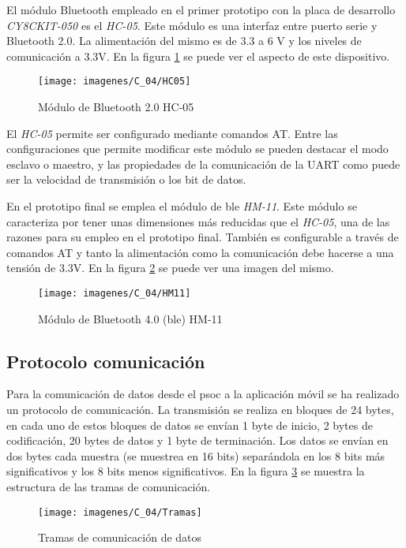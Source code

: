 El módulo Bluetooth empleado en el primer prototipo con la placa de desarrollo \textit{CY8CKIT-050} es el \textit{HC-05}. Este módulo es una interfaz entre puerto serie y Bluetooth 2.0. La alimentación del mismo es de 3.3 a 6 V y los niveles de comunicación a 3.3V. En la figura \ref{fig:HC05} se puede ver el aspecto de este dispositivo.

\begin{figure}[!ht]
	\center
	\texttt{[image: imagenes/C\_04/HC05]}
	\caption{Módulo de Bluetooth 2.0 HC-05}
	\label{fig:HC05}
\end{figure}

El \textit{HC-05} permite ser configurado mediante comandos AT. Entre las configuraciones que permite modificar este módulo se pueden destacar el modo esclavo o maestro, y las propiedades de la comunicación de la UART como puede ser la velocidad de transmisión o los bit de datos.
 
En el prototipo final se emplea el módulo de \acrshort{ble} \textit{HM-11}. Este módulo se caracteriza por tener unas dimensiones más reducidas que el \textit{HC-05}, una de las razones para su empleo en el prototipo final. También es configurable a través de comandos AT y tanto la alimentación como la comunicación debe hacerse a una tensión de 3.3V. En la figura \ref{fig:HC11} se puede ver una imagen del mismo.

\begin{figure}[!ht]
	\center
	\texttt{[image: imagenes/C\_04/HM11]}
	\caption{Módulo de Bluetooth 4.0 (\acrshort{ble}) HM-11}
	\label{fig:HC11}
\end{figure}


\subsection{Protocolo comunicación}
Para la comunicación de datos desde el \acrshort{psoc} a la aplicación móvil se ha realizado un protocolo de comunicación. La transmisión se realiza en bloques de 24 bytes, en cada uno de estos bloques de datos se envían 1 byte de inicio, 2 bytes de codificación, 20 bytes de datos y 1 byte de terminación. Los datos se envían en dos bytes cada muestra (se muestrea en 16 bits) separándola en los 8 bits más significativos y los 8 bits menos significativos. En la figura \ref{fig:tramas} se muestra la estructura de las tramas de comunicación.

\begin{figure}[!ht]
	\center
	\texttt{[image: imagenes/C\_04/Tramas]}
	\caption{Tramas de comunicación de datos}
	\label{fig:tramas}
\end{figure}

